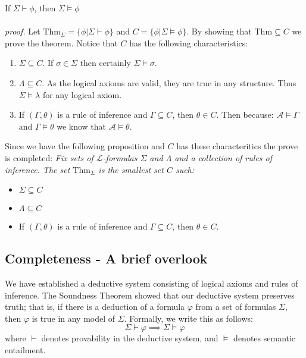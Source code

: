 \documentclass[10pt,a4paper]{article}
\newcounter{theo}
\newcommand{\curveL}{\mathcal{L}}
\newcommand{\curveA}{\mathcal{A}}
\newcommand{\thm}{\text{Thm}}
\begin{document}
                        \begin{theorem}
                            If $\Sigma\vdash\phi$, then $\Sigma\vDash\phi$
                            \\
                            \\
                            \textit{proof.} Let $\thm_\Sigma = \{\phi | \Sigma \vdash\phi\}$ and $C =\{\phi | \Sigma \vDash \phi\}$. By showing that $\thm\subseteq C$ we prove the theorem. Notice that $C$ has the following characteristics:
                            \begin{enumerate}
                                \item $\Sigma \subseteq C$. If $\sigma\in\Sigma$ then certainly $\Sigma\vDash\sigma$.
                                \item $\Lambda\subseteq C$. As the logical axioms are valid, they are true in any structure. Thus $\Sigma\vDash\lambda$ for any logical axiom.
                                \item If $(\Gamma,\theta)$ is a rule of inference and $\Gamma\subseteq C$, then $\theta\in C$. Then because: $\curveA\vDash\Gamma$ and $\Gamma\vDash\theta$ we know that $\curveA\vDash\theta$.
                            \end{enumerate}
                            Since we have the following proposition and $C$ has these characteritics the prove is completed:
                            \textit{Fix sets of $\curveL$-formulas $\Sigma$ and $\Lambda$ and a collection of rules of inference. The set $\thm_\Sigma$ is the smallest set $C$ such:}
                            \begin{itemize}
                                \item $\Sigma\subseteq C$
                                \item $\Lambda\subseteq C$ 
                                \item If $(\Gamma,\theta)$ is a rule of inference and $\Gamma\subseteq C$, then $\theta\in C$.
                            \end{itemize}
                        \end{theorem}
                    \subsection{Completeness - A brief overlook}
                        We have established a deductive system consisting of logical axioms and rules of inference. The Soundness Theorem showed that our deductive system preserves truth; that is, if there is a deduction of a formula $\varphi$ from a set of formulas $\Sigma$, then $\varphi$ is true in any model of $\Sigma$. Formally, we write this as follows:
                        $$\Sigma \vdash \varphi \implies \Sigma \models \varphi$$
                        where $\vdash$ denotes provability in the deductive system, and $\models$ denotes semantic entailment.
                        
\end{document}
